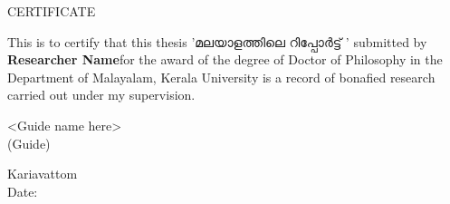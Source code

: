 \newpage
\thispagestyle{empty}

\begin{center}

{\gentium
\huge{CERTIFICATE}
}\\[0.5cm]

\end{center}

{\gentium
\normalsize This is to certify that this thesis} {\manjari'മലയാളത്തിലെ റിപ്പോർട്ട് '} {\gentium submitted by \textbf{Researcher Name}for the award of the degree of Doctor of Philosophy in the Department of Malayalam, Kerala University is a record of bonafied research carried out under my supervision.}\\[1.0cm]


\vspace{.5in}


\begin{flushright}
<Guide name here>\\
(Guide)\\[1.5cm]

\end{flushright}

\begin{flushleft}
Kariavattom\\
Date:
\end{flushleft}
